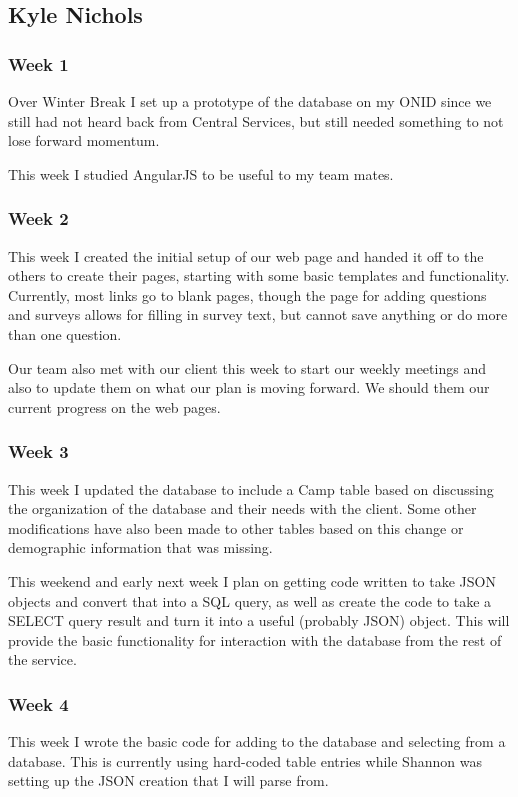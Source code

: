 \documentclass[letterpaper,10pt,serif, draftclsnofoot,onecolumn, compsoc, titlepage]{IEEEtran}
\begin{document}
\subsection{Kyle Nichols}
\subsubsection{Week 1}
Over Winter Break I set up a prototype of the database on my ONID since we still had not heard back from Central Services, but still needed something to not lose forward momentum.

This week I studied AngularJS to be useful to my team mates.
\subsubsection{Week 2}
This week I created the initial setup of our web page and handed it off to the others to create their pages, starting with some basic templates and functionality.
Currently, most links go to blank pages, though the page for adding questions and surveys allows for filling in survey text, but cannot save anything or do more than one question.

Our team also met with our client this week to start our weekly meetings and also to update them on what our plan is moving forward. We should them our current progress on the web pages.
\subsubsection{Week 3}
This week I updated the database to include a Camp table based on discussing the organization of the database and their needs with the client.
Some other modifications have also been made to other tables based on this change or demographic information that was missing.

This weekend and early next week I plan on getting code written to take JSON objects and convert that into a SQL query, as well as create the code to take a SELECT query result and turn it into a useful (probably JSON) object.
This will provide the basic functionality for interaction with the database from the rest of the service.
\subsubsection{Week 4}
This week I wrote the basic code for adding to the database and selecting from a database.
This is currently using hard-coded table entries while Shannon was setting up the JSON creation that I will parse from.
\end{document}
